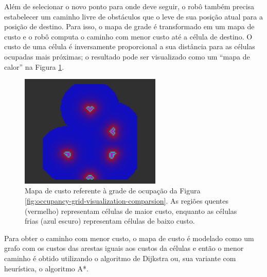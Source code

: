 Além de selecionar o novo ponto para onde deve seguir, o robô também 
precisa estabelecer um caminho livre de obstáculos que o leve de sua 
posição atual para a posição de destino. Para isso, o mapa de grade é 
transformado em um mapa de custo e o robô computa o caminho com menor custo até a célula de destino. O custo de uma célula é inversamente 
proporcional a sua distância para as células ocupadas mais próximas; o 
resultado pode ser visualizado como um ``mapa de calor'' na Figura 
\ref{fig:costmap}.

\begin{figure}
  \centering
  \includegraphics[width=0.6\textwidth]{figs/costmap.png}
  \caption[Mapa de custo de ocupação]{Mapa de custo referente à grade de ocupação da Figura \ref{fig:occupancy-grid-visualization-comparsion}. As regiões quentes (vermelho) representam células de maior custo, enquanto as células 
  frias (azul escuro) representam células de baixo custo.}
  \label{fig:costmap}
\end{figure}

Para obter o caminho com menor custo, o mapa de custo é modelado como 
um grafo com os custos das arestas iguais aos custos da células e então 
o menor caminho é obtido utilizando o algoritmo de Dijkstra ou, sua 
variante com heurística, o algoritmo A*.